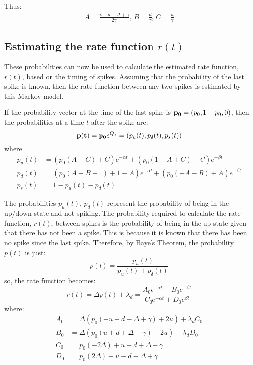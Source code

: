 Thus:
\begin{equation}
\begin{split}
A = \frac{u-d - \Delta + \gamma}{2\gamma},\, B = \frac{d}{\gamma}, \,C = \frac{u}{\gamma}
\end{split}
\end{equation}

\subsection{Estimating the rate function $r(t)$}

These probabilities can now be used to calculate the estimated rate function, $r(t)$, based on the timing of spikes.  Assuming that the probability of the last spike is known, then the rate function between any two spikes is estimated by this Markov model. 

If the probability vector at the time of the last spike is ${\bf p_0}=(p_0, 1-p_0,0)$, then the probabilities at a time $t$ after the spike are:
\begin{equation}
{\bf p(t)} = {\bf p_0}e^{Q_s} = (p_u(t),p_d(t),p_s(t))
\end{equation}
where
\begin{equation}
\begin{split}
p_u(t) &= (p_0(A-C)+C)e^{-\alpha t}+(p_0(1-A+C)-C)e^{-\beta t}\\
p_d(t) &= (p_0(A+B-1)+1-A)e^{-\alpha t}+(p_0(-A-B)+A)e^{-\beta t}\\
p_s(t) &= 1 - p_u(t) - p_d(t)
\end{split}
\end{equation}

The probabilities $p_u(t), \,p_d(t)$ represent the probability of being in the up/down state and not spiking.  The probability required to calculate the rate function, $r(t)$, between spikes is the probability of being in the up-state given that there has not been a spike.  This is because it is known that there has been no spike since the last spike.  Therefore, by Baye's Theorem, the probability $p(t)$ is just:
\begin{equation}
p(t)  = \frac{p_u(t)}{p_u(t) + p_d(t)}
\end{equation}
so, the rate function becomes:
\begin{equation}\label{roft}
r(t) = \Delta p(t) + \lambda_d = \frac{A_0e^{-\alpha t}+B_0e^{-\beta t}}{C_0e^{-\alpha t} + D_0e^{\beta t}}
\end{equation}
where:
\begin{equation}
\begin{split}
\label{abcd}
A_0 & = \Delta(p_0(-u-d-\Delta + \gamma)+2u)+\lambda_dC_0\\
B_0 & =\Delta(p_0(u+d+\Delta + \gamma)-2u)+\lambda_dD_0\\
C_0 & = p_0(-2\Delta)+u+d+\Delta+\gamma\\
D_0 & = p_0(2\Delta) -u-d-\Delta + \gamma
\end{split}
\end{equation}

